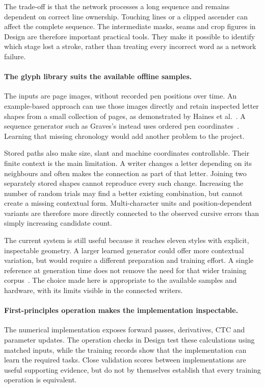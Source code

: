 The trade-off is that the network processes a long sequence and remains dependent on correct line ownership. Touching lines or a clipped ascender can affect the complete sequence. The intermediate masks, seams and crop figures in Design are therefore important practical tools. They make it possible to identify which stage lost a stroke, rather than treating every incorrect word as a network failure.

\paragraph{The glyph library suits the available offline samples.}
The inputs are page images, without recorded pen positions over time. An example-based approach can use those images directly and retain inspected letter shapes from a small collection of pages, as demonstrated by Haines et al.~\cite[p.~4]{haines2016}. A sequence generator such as Graves's instead uses ordered pen coordinates~\cite[p.~18]{graves2013}. Learning that missing chronology would add another problem to the project.

Stored paths also make size, slant and machine coordinates controllable. Their finite context is the main limitation. A writer changes a letter depending on its neighbours and often makes the connection as part of that letter. Joining two separately stored shapes cannot reproduce every such change. Increasing the number of random trials may find a better existing combination, but cannot create a missing contextual form. Multi-character units and position-dependent variants are therefore more directly connected to the observed cursive errors than simply increasing candidate count.

The current system is still useful because it reaches eleven styles with explicit, inspectable geometry. A larger learned generator could offer more contextual variation, but would require a different preparation and training effort. A single reference at generation time does not remove the need for that wider training corpus~\cite[p.~9]{dai2024}. The choice made here is appropriate to the available samples and hardware, with its limits visible in the connected writers.

\paragraph{First-principles operation makes the implementation inspectable.}
The numerical implementation exposes forward passes, derivatives, CTC and parameter updates. The operation checks in Design test these calculations using matched inputs, while the training records show that the implementation can learn the required tasks. Close validation scores between implementations are useful supporting evidence, but do not by themselves establish that every training operation is equivalent.

